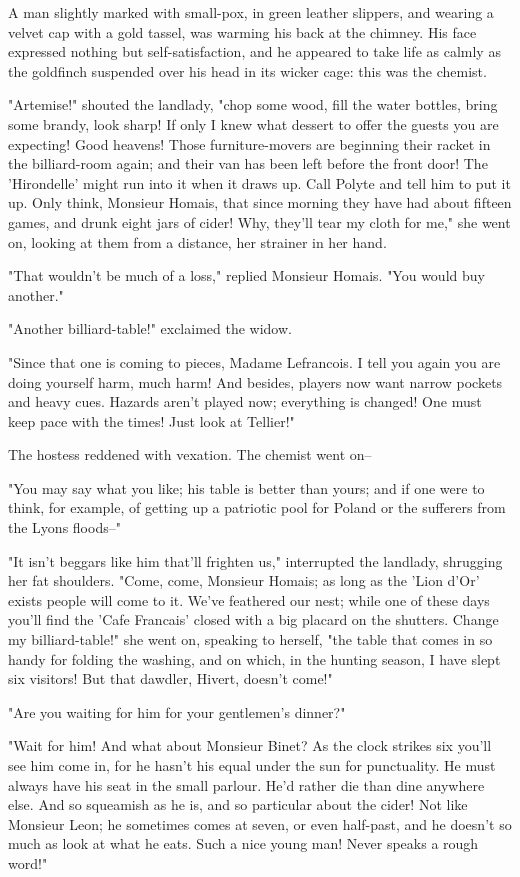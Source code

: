 \documentclass{tufte-book}
\begin{document}
A man slightly marked with small-pox, in green leather slippers, and
wearing a velvet cap with a gold tassel, was warming his back at the
chimney. His face expressed nothing but self-satisfaction, and he
appeared to take life as calmly as the goldfinch suspended over his head
in its wicker cage: this was the chemist.

"Artemise!" shouted the landlady, "chop some wood, fill the water
bottles, bring some brandy, look sharp! If only I knew what dessert to
offer the guests you are expecting! Good heavens! Those furniture-movers
are beginning their racket in the billiard-room again; and their van has
been left before the front door! The 'Hirondelle' might run into it when
it draws up. Call Polyte and tell him to put it up. Only think, Monsieur
Homais, that since morning they have had about fifteen games, and drunk
eight jars of cider! Why, they'll tear my cloth for me," she went on,
looking at them from a distance, her strainer in her hand.

"That wouldn't be much of a loss," replied Monsieur Homais. "You would
buy another."

"Another billiard-table!" exclaimed the widow.

"Since that one is coming to pieces, Madame Lefrancois. I tell you again
you are doing yourself harm, much harm! And besides, players now want
narrow pockets and heavy cues. Hazards aren't played now; everything is
changed! One must keep pace with the times! Just look at Tellier!"

The hostess reddened with vexation. The chemist went on--

"You may say what you like; his table is better than yours; and if one
were to think, for example, of getting up a patriotic pool for Poland or
the sufferers from the Lyons floods--"

"It isn't beggars like him that'll frighten us," interrupted the
landlady, shrugging her fat shoulders. "Come, come, Monsieur Homais; as
long as the 'Lion d'Or' exists people will come to it. We've feathered
our nest; while one of these days you'll find the 'Cafe Francais' closed
with a big placard on the shutters. Change my billiard-table!" she went
on, speaking to herself, "the table that comes in so handy for folding
the washing, and on which, in the hunting season, I have slept six
visitors! But that dawdler, Hivert, doesn't come!"

"Are you waiting for him for your gentlemen's dinner?"

"Wait for him! And what about Monsieur Binet? As the clock strikes
six you'll see him come in, for he hasn't his equal under the sun for
punctuality. He must always have his seat in the small parlour. He'd
rather die than dine anywhere else. And so squeamish as he is, and so
particular about the cider! Not like Monsieur Leon; he sometimes comes
at seven, or even half-past, and he doesn't so much as look at what he
eats. Such a nice young man! Never speaks a rough word!"
\end{document}
